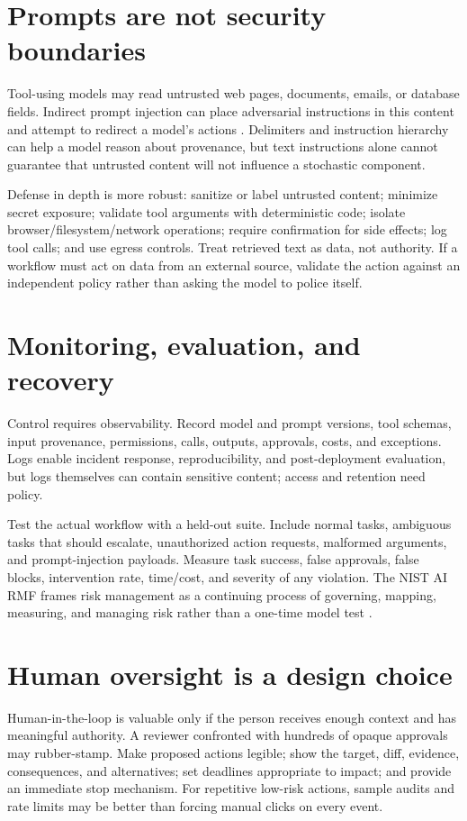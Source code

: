 \documentclass[11pt]{article}\usepackage[margin=1in]{geometry}\usepackage[T1]{fontenc}\usepackage{lmodern,microtype,hyperref,enumitem}\hypersetup{colorlinks=true,urlcolor=blue,citecolor=blue,linkcolor=blue}
\begin{document}
\section{Prompts are not security boundaries}
Tool-using models may read untrusted web pages, documents, emails, or database fields. Indirect prompt injection can place adversarial instructions in this content and attempt to redirect a model's actions \cite{greshake2023not}. Delimiters and instruction hierarchy can help a model reason about provenance, but text instructions alone cannot guarantee that untrusted content will not influence a stochastic component.

Defense in depth is more robust: sanitize or label untrusted content; minimize secret exposure; validate tool arguments with deterministic code; isolate browser/filesystem/network operations; require confirmation for side effects; log tool calls; and use egress controls. Treat retrieved text as data, not authority. If a workflow must act on data from an external source, validate the action against an independent policy rather than asking the model to police itself.
\section{Monitoring, evaluation, and recovery}
Control requires observability. Record model and prompt versions, tool schemas, input provenance, permissions, calls, outputs, approvals, costs, and exceptions. Logs enable incident response, reproducibility, and post-deployment evaluation, but logs themselves can contain sensitive content; access and retention need policy.

Test the actual workflow with a held-out suite. Include normal tasks, ambiguous tasks that should escalate, unauthorized action requests, malformed arguments, and prompt-injection payloads. Measure task success, false approvals, false blocks, intervention rate, time/cost, and severity of any violation. The NIST AI RMF frames risk management as a continuing process of governing, mapping, measuring, and managing risk rather than a one-time model test \cite{nist2023ai}.
\section{Human oversight is a design choice}
Human-in-the-loop is valuable only if the person receives enough context and has meaningful authority. A reviewer confronted with hundreds of opaque approvals may rubber-stamp. Make proposed actions legible; show the target, diff, evidence, consequences, and alternatives; set deadlines appropriate to impact; and provide an immediate stop mechanism. For repetitive low-risk actions, sample audits and rate limits may be better than forcing manual clicks on every event.
\end{document}
